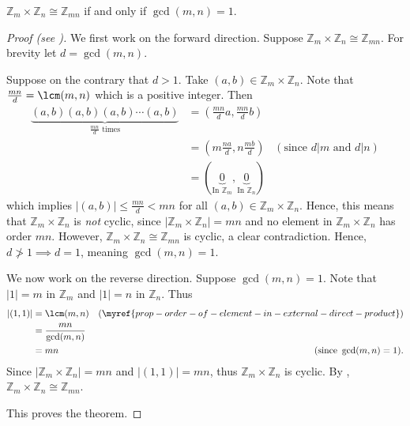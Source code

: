 \begin{theorem}\label{thrm-Zm-cross-Zn-isomorphic-to-Zmn-condition}
    $\mathbb{Z}_m \times \mathbb{Z}_n \cong \mathbb{Z}_{mn}$ if and only if $\gcd(m,n) = 1$.
\end{theorem}
\begin{proof}[Proof (see {\cite[Proposition 13.1 (3)]{humphreys_1996}})]
    We first work on the forward direction. Suppose $\mathbb{Z}_m \times \mathbb{Z}_n \cong \mathbb{Z}_{mn}$. For brevity let $d = \gcd(m,n)$.
    
    Suppose on the contrary that $d > 1$. Take $(a, b) \in \mathbb{Z}_m \times \mathbb{Z}_n$. Note that $\frac{mn}{d} = \lcm(m,n)$ which is a positive integer. Then
    \begin{align*}
        \underbrace{(a,b)(a,b)(a,b)\cdots(a,b)}_{\frac{mn}{d}\text{ times}} &= \left(\frac{mn}{d}a, \frac{mn}{d}b\right)\\
        &= \left(m\frac{na}{d}, n\frac{mb}{d}\right) & (\text{since } d | m \text{ and } d | n)\\
        &= (\underbrace{0}_{\text{In } \mathbb{Z}_m}, \underbrace{0}_{\text{In } \mathbb{Z}_n})
    \end{align*}
    which implies $|(a, b)| \leq \frac{mn}{d} < mn$ for all $(a, b) \in \mathbb{Z}_m \times \mathbb{Z}_n$. Hence, this means that $\mathbb{Z}_m \times \mathbb{Z}_n$ is \textit{not} cyclic, since $|\mathbb{Z}_m \times \mathbb{Z}_n| = mn$ and no element in $\mathbb{Z}_m \times \mathbb{Z}_n$ has order $mn$. However, $\mathbb{Z}_m \times \mathbb{Z}_n \cong \mathbb{Z}_{mn}$ is cyclic, a clear contradiction. Hence, $d \not>1 \implies d = 1$, meaning $\gcd(m,n) = 1$.

    We now work on the reverse direction. Suppose $\gcd(m,n) = 1$. Note that $|1| = m$ in $\mathbb{Z}_m$ and $|1| = n$ in $\mathbb{Z}_n$. Thus
    \begin{align*}
        |(1, 1)| &= \lcm(m, n) & (\myref{prop-order-of-element-in-external-direct-product})\\
        &= \frac{mn}{\gcd(m,n)}\\
        &= mn & (\text{since }\gcd(m,n) = 1).
    \end{align*}
    Since $|\mathbb{Z}_m \times \mathbb{Z}_n| = mn$ and $|(1,1)| = mn$, thus $\mathbb{Z}_m \times \mathbb{Z}_n$ is cyclic. By , $\mathbb{Z}_m \times \mathbb{Z}_n \cong \mathbb{Z}_{mn}$.

    This proves the theorem.
\end{proof}

